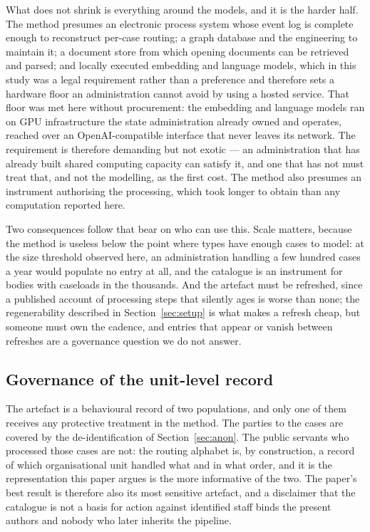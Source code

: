 What does not shrink is everything around the models, and it is the harder half. The method
presumes an electronic process system whose event log is complete enough to reconstruct
per-case routing; a graph database and the engineering to maintain it; a document store from
which opening documents can be retrieved and parsed; and locally executed embedding and
language models, which in this study was a legal requirement rather than a preference and
therefore sets a hardware floor an administration cannot avoid by using a hosted service. That
floor was met here without procurement: the embedding and language models ran on GPU
infrastructure the state administration already owned and operates, reached over an
OpenAI-compatible interface that never leaves its network. The requirement is therefore
demanding but not exotic --- an administration that has already built shared computing capacity
can satisfy it, and one that has not must treat that, and not the modelling, as the first cost.
The method also presumes an instrument authorising the processing, which took longer to obtain
than any computation reported here.

Two consequences follow that bear on who can use this. Scale matters, because the method is
useless below the point where types have enough cases to model: at the size threshold observed
here, an administration handling a few hundred cases a year would populate no entry at all, and
the catalogue is an instrument for bodies with caseloads in the thousands. And the artefact must
be refreshed, since a published account of processing steps that silently ages is worse than
none; the regenerability described in Section~\ref{sec:setup} is what makes a refresh cheap, but
someone must own the cadence, and entries that appear or vanish between refreshes are a
governance question we do not answer.

\subsection{Governance of the unit-level record}\label{sec:governance}

The artefact is a behavioural record of two populations, and only one of them receives any
protective treatment in the method. The parties to the cases are covered by the de-identification
of Section~\ref{sec:anon}. The public servants who processed those cases are not: the routing
alphabet is, by construction, a record of which organisational unit handled what and in what
order, and it is the representation this paper argues is the more informative of the two. The
paper's best result is therefore also its most sensitive artefact, and a disclaimer that the
catalogue is not a basis for action against identified staff binds the present authors and
nobody who later inherits the pipeline.

